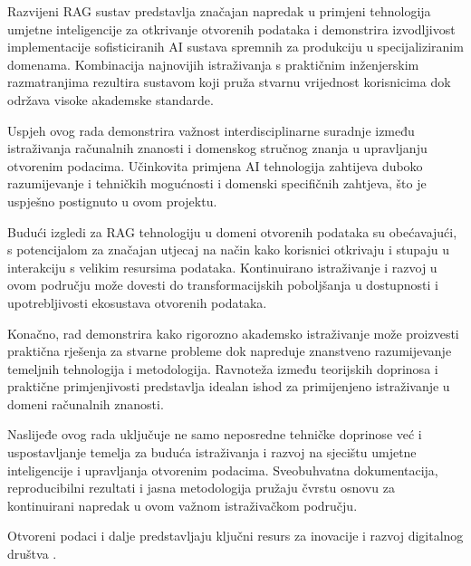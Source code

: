 Razvijeni RAG sustav predstavlja značajan napredak u primjeni tehnologija umjetne inteligencije za otkrivanje otvorenih podataka i demonstrira izvodljivost implementacije sofisticiranih AI sustava spremnih za produkciju u specijaliziranim domenama. Kombinacija najnovijih istraživanja s praktičnim inženjerskim razmatranjima rezultira sustavom koji pruža stvarnu vrijednost korisnicima dok održava visoke akademske standarde.

Uspjeh ovog rada demonstrira važnost interdisciplinarne suradnje između istraživanja računalnih znanosti i domenskog stručnog znanja u upravljanju otvorenim podacima. Učinkovita primjena AI tehnologija zahtijeva duboko razumijevanje i tehničkih mogućnosti i domenski specifičnih zahtjeva, što je uspješno postignuto u ovom projektu.

Budući izgledi za RAG tehnologiju u domeni otvorenih podataka su obećavajući, s potencijalom za značajan utjecaj na način kako korisnici otkrivaju i stupaju u interakciju s velikim resursima podataka. Kontinuirano istraživanje i razvoj u ovom području može dovesti do transformacijskih poboljšanja u dostupnosti i upotrebljivosti ekosustava otvorenih podataka.

Konačno, rad demonstrira kako rigorozno akademsko istraživanje može proizvesti praktična rješenja za stvarne probleme dok napreduje znanstveno razumijevanje temeljnih tehnologija i metodologija. Ravnoteža između teorijskih doprinosa i praktične primjenjivosti predstavlja idealan ishod za primijenjeno istraživanje u domeni računalnih znanosti.

Naslijeđe ovog rada uključuje ne samo neposredne tehničke doprinose već i uspostavljanje temelja za buduća istraživanja i razvoj na sjecištu umjetne inteligencije i upravljanja otvorenim podacima. Sveobuhvatna dokumentacija, reproducibilni rezultati i jasna metodologija pružaju čvrstu osnovu za kontinuirani napredak u ovom važnom istraživačkom području.

Otvoreni podaci i dalje predstavljaju ključni resurs za inovacije i razvoj digitalnog društva \cite{janssen2012benefits}. 
